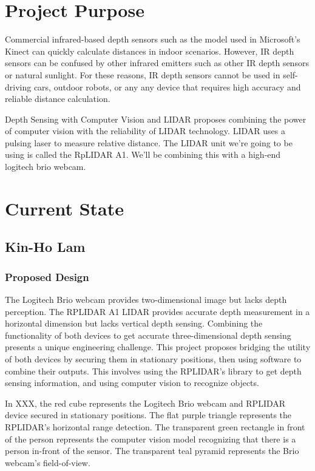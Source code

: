 \documentclass[onecolumn, draftclsnofoot,10pt, compsoc]{IEEEtran}
\begin{document}
\begin{singlespace}

	\section{Project Purpose}
		Commercial infrared-based depth sensors such as the model used in Microsoft’s Kinect can quickly calculate distances in indoor scenarios. However, IR depth sensors can be confused by other infrared emitters such as other IR depth sensors or natural sunlight. For these reasons, IR depth sensors cannot be used in self-driving cars, outdoor robots, or any any device that requires high accuracy and reliable distance calculation.

		Depth Sensing with Computer Vision and LIDAR proposes combining the power of computer vision with the reliability of LIDAR technology. LIDAR uses a pulsing laser to measure relative distance. The LIDAR unit we're going to be using is called the RpLIDAR A1. We'll be combining this with a high-end logitech brio webcam.

	\section{Current State}

	\subsection{Kin-Ho Lam}
		\subsubsection{Proposed Design}
			The Logitech Brio webcam provides two-dimensional image but lacks depth perception. The RPLIDAR A1 LIDAR provides accurate depth measurement in a horizontal dimension but lacks vertical depth sensing. Combining the functionality of both devices to get accurate three-dimensional depth sensing presents a unique engineering challenge. This project proposes bridging the utility of both devices by securing them in stationary positions, then using software to combine their outputs. This involves using the RPLIDAR’s library to get depth sensing information, and using computer vision to recognize objects.

			In XXX, the red cube represents the Logitech Brio webcam and RPLIDAR device secured in stationary positions. The flat purple triangle represents the RPLIDAR’s horizontal range detection. The transparent green rectangle in front of the person represents the computer vision model recognizing that there is a person in-front of the sensor. The transparent teal pyramid represents the Brio webcam’s field-of-view. 
			

\end{singlespace}
\end{document}
